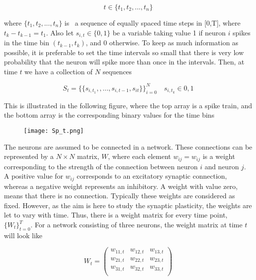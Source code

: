 \begin{equation}
    t \in \{t_1, t_2, ..., t_n\} 
\end{equation}

 where $\{t_1, t_2, ..., t_n\}$ is \ a sequence of equally spaced time steps in [0,T], where $t_{k}-t_{k-1} = t_1$. Also let $s_{i,t} \in \{0,1\}$ be a variable taking value 1 if neuron $i$ spikes in the time bin $(t_{k-1}, t_{k})$, and 0 otherwise. To keep as much information as possible, it is preferable to set the time intervals so small that there is very low probability that the neuron will spike more than once in the intervals. Then, at time $t$ we have a collection of $N$ sequences

\begin{equation}
    S_{t} = \{\{s_{i,t_1}, ,...,s_{i,t-1},s_{it}\}\}_{i=0}^{N} \quad s_{i,t_k} \in {0,1}
\end{equation}

This is illustrated in the following figure, where the top array is a spike train, and the bottom array is the corresponding binary values for the time bins

\begin{figure}[h]
    \centering
    \texttt{[image: Sp\_t.png]}
\end{figure} 

The neurons are assumed to be connected in a network. These connections can be represented by a $N \times N$ matrix, $W$, where each element $w_{ij}=w_{ij}$ is a weight corresponding to the strength of the connection between neuron $i$ and neuron $j$. A positive value for $w_{ij}$ corresponds to an excitatory synaptic connection, whereas a negative weight represents an inhibitory. A weight with value zero, means that there is no connection. 
Typically these weights are considered as fixed. However, as the aim is here to study the synaptic plasticity, the weights are let to vary with time. Thus, there is a weight matrix for every time point, $\{W_t\}_{t=0}^{T}$. For a network consisting of three neurons, the weight matrix at time $t$ will look like

\begin{equation*}
W_t = 
\begin{pmatrix}
w_{11,t} & w_{12,t} & w_{13,t}\\
w_{21,t} & w_{22,t} & w_{23,t}\\
w_{31,t} & w_{32,t} & w_{33,t}\\
\end{pmatrix} 
\end{equation*}
\\

